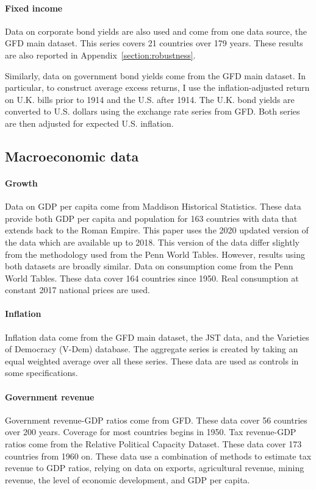 \paragraph{Fixed income}

Data on corporate bond yields are also used and come from one data source, the GFD main dataset. This series covers 21 countries over 179 years.  These results are also reported in Appendix~\ref{section:robustness}. 

Similarly, data on government bond yields come from the GFD main dataset. In particular, to construct average excess returns, I use the inflation-adjusted return on U.K. bills prior to 1914 and the U.S. after 1914. The U.K. bond yields are converted to U.S. dollars using the exchange rate series from GFD. Both series are then adjusted for expected U.S. inflation.
\label{par:convert_dollars_bnd}

\subsection{Macroeconomic data}\label{section:macro_data}

\paragraph{Growth}
Data on GDP per capita come from Maddison Historical Statistics.  These data provide both GDP per capita and population for 163 countries with data that extends back to the Roman Empire.  This paper uses the 2020 updated version of the data which are available up to 2018. This version of the data differ slightly from the methodology used from the Penn World Tables. However, results using both datasets are broadly similar. Data on consumption come from the Penn World Tables. These data cover 164 countries since 1950. Real consumption at constant 2017 national prices are used.

\paragraph{Inflation}
Inflation data come from the GFD main dataset, the JST data, and the Varieties of Democracy (V-Dem) database. The aggregate series is created by taking an equal weighted average over all these series. These data are used as controls in some specifications.

\paragraph{Government revenue}
Government revenue-GDP ratios come from GFD.  These data cover 56 countries over 200 years. Coverage for most countries begins in 1950. Tax revenue-GDP ratios come from the Relative Political Capacity Dataset. These data cover 173 countries from 1960 on. These data use a combination of methods to estimate tax revenue to GDP ratios, relying on data on exports, agricultural revenue, mining revenue, the level of economic development, and GDP per capita. 


